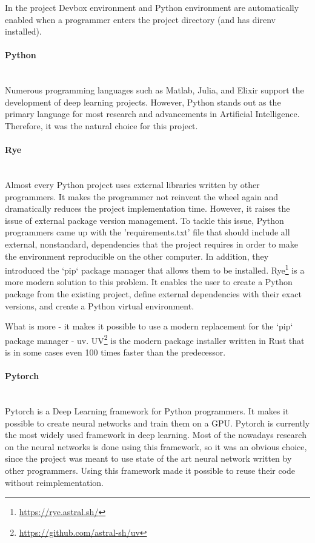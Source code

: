 In the project Devbox environment and Python environment are automatically enabled when a programmer enters the project directory (and has direnv installed).
\paragraph{Python}\mbox{}\\
\indent Numerous programming languages such as Matlab, Julia, and Elixir support the development of deep learning projects. However, Python stands out as the primary language for most research and advancements in Artificial Intelligence. Therefore, it was the natural choice for this project.
\paragraph{Rye}\mbox{}\\
\indent Almost every Python project uses external libraries written by other programmers. It makes the programmer not reinvent the wheel again and dramatically reduces the project implementation time. However, it raises the issue of external package version management. To tackle this issue, Python programmers came up with the 'requirements.txt' file that should include all external, nonstandard, dependencies that the project requires in order to make the environment reproducible on the other computer. In addition, they introduced the `pip` package manager that allows them to be installed. 
Rye\footnote{\url{https://rye.astral.sh/}} is a more modern solution to this problem. It enables the user to create a Python package from the existing project, define external dependencies with their exact versions, and create a Python virtual environment. 

What is more - it makes it possible to use a modern replacement for the `pip` package manager - uv. UV\footnote{\url{https://github.com/astral-sh/uv}} is the modern package installer written in Rust that is in some cases even 100 times faster than the predecessor.  
\paragraph{Pytorch}\mbox{}\\
\indent Pytorch\cite{NEURIPS2019_9015} is a Deep Learning framework for Python programmers. It makes it possible to create neural networks and train them on a GPU. Pytorch is currently the most widely used framework in deep learning.
Most of the nowadays research on the neural networks is done using this framework, so it was an obvious choice, since the project was meant to use state of the art neural network written by other programmers. Using this framework made it possible to reuse their code without reimplementation. 
